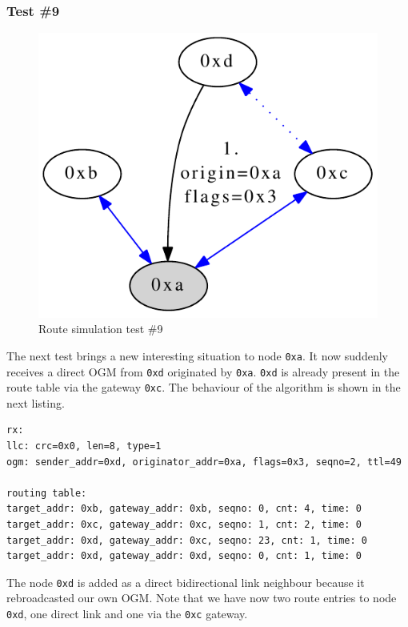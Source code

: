 \subsubsection{Test \#9}%
\begin{figure}[H]
  \begin{center}
    \includegraphics[]{figures/test9}
  \end{center}
  \caption{Route simulation test \#9}
\end{figure}

The next test brings a new interesting situation to node \texttt{0xa}. It now suddenly receives a direct OGM from \texttt{0xd} originated by \texttt{0xa}. \texttt{0xd} is already present in the route table via the gateway \texttt{0xc}. The behaviour of the algorithm is shown in the next listing.

\begin{lstlisting}[label=sim:test1,caption=Output of Test \#9]
rx:
llc: crc=0x0, len=8, type=1
ogm: sender_addr=0xd, originator_addr=0xa, flags=0x3, seqno=2, ttl=49

routing table: 
target_addr: 0xb, gateway_addr: 0xb, seqno: 0, cnt: 4, time: 0
target_addr: 0xc, gateway_addr: 0xc, seqno: 1, cnt: 2, time: 0
target_addr: 0xd, gateway_addr: 0xc, seqno: 23, cnt: 1, time: 0
target_addr: 0xd, gateway_addr: 0xd, seqno: 0, cnt: 1, time: 0
\end{lstlisting}

The node \texttt{0xd} is added as a direct bidirectional link neighbour because it rebroadcasted our own OGM. Note that we have now two route entries to node \texttt{0xd}, one direct link and one via the \texttt{0xc} gateway.


